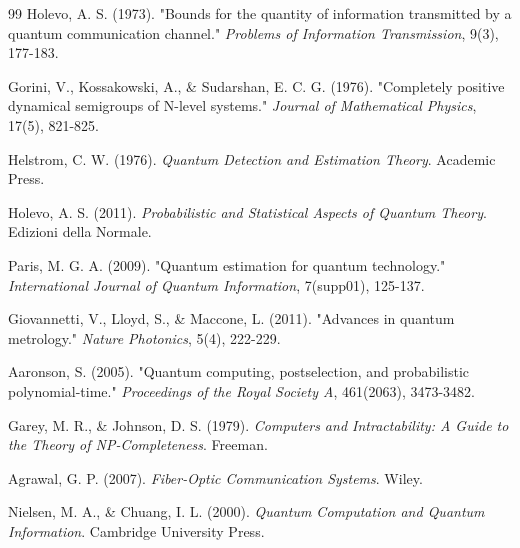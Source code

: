 \documentclass[12pt]{article}
\begin{document}
\begin{thebibliography}{99}
 Holevo, A. S. (1973). "Bounds for the quantity of information transmitted by a quantum communication channel." \textit{Problems of Information Transmission}, 9(3), 177-183.

 Gorini, V., Kossakowski, A., \& Sudarshan, E. C. G. (1976). "Completely positive dynamical semigroups of N-level systems." \textit{Journal of Mathematical Physics}, 17(5), 821-825.

 Helstrom, C. W. (1976). \textit{Quantum Detection and Estimation Theory}. Academic Press.

 Holevo, A. S. (2011). \textit{Probabilistic and Statistical Aspects of Quantum Theory}. Edizioni della Normale.

 Paris, M. G. A. (2009). "Quantum estimation for quantum technology." \textit{International Journal of Quantum Information}, 7(supp01), 125-137.

 Giovannetti, V., Lloyd, S., \& Maccone, L. (2011). "Advances in quantum metrology." \textit{Nature Photonics}, 5(4), 222-229.

 Aaronson, S. (2005). "Quantum computing, postselection, and probabilistic polynomial-time." \textit{Proceedings of the Royal Society A}, 461(2063), 3473-3482.

 Garey, M. R., \& Johnson, D. S. (1979). \textit{Computers and Intractability: A Guide to the Theory of NP-Completeness}. Freeman.

 Agrawal, G. P. (2007). \textit{Fiber-Optic Communication Systems}. Wiley.

 Nielsen, M. A., \& Chuang, I. L. (2000). \textit{Quantum Computation and Quantum Information}. Cambridge University Press.
\end{thebibliography}
\end{document}
